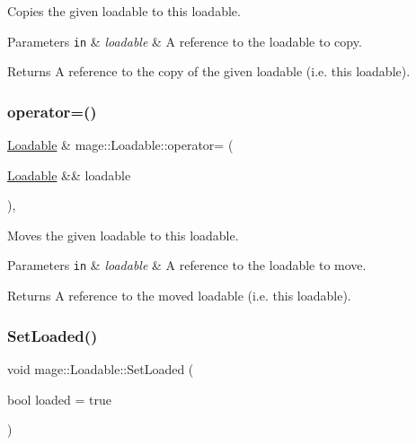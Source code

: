 Copies the given loadable to this loadable.


\begin{DoxyParams}[1]{Parameters}
\mbox{\tt in}  & {\em loadable} & A reference to the loadable to copy. \\
\hline
\end{DoxyParams}
\begin{DoxyReturn}{Returns}
A reference to the copy of the given loadable (i.\+e. this loadable). 
\end{DoxyReturn}
\hypertarget{classmage_1_1_loadable_a3853fa7d95ef2b5c8d27ff9884b73633}{}\label{classmage_1_1_loadable_a3853fa7d95ef2b5c8d27ff9884b73633} 
\subsubsection{\texorpdfstring{operator=()}{operator=()}\hspace{0.1cm}{\footnotesize\ttfamily [2/2]}}
{\footnotesize\ttfamily \hyperlink{classmage_1_1_loadable}{Loadable} \& mage\+::\+Loadable\+::operator= (\begin{DoxyParamCaption}\item[{\hyperlink{classmage_1_1_loadable}{Loadable} \&\&}]{loadable }\end{DoxyParamCaption})\hspace{0.3cm}{\ttfamily [protected]}, {\ttfamily [default]}}

Moves the given loadable to this loadable.


\begin{DoxyParams}[1]{Parameters}
\mbox{\tt in}  & {\em loadable} & A reference to the loadable to move. \\
\hline
\end{DoxyParams}
\begin{DoxyReturn}{Returns}
A reference to the moved loadable (i.\+e. this loadable). 
\end{DoxyReturn}
\hypertarget{classmage_1_1_loadable_a932ff8b287c8e68e30a13804cba08ff2}{}\label{classmage_1_1_loadable_a932ff8b287c8e68e30a13804cba08ff2} 
\subsubsection{\texorpdfstring{Set\+Loaded()}{SetLoaded()}}
{\footnotesize\ttfamily void mage\+::\+Loadable\+::\+Set\+Loaded (\begin{DoxyParamCaption}\item[{bool}]{loaded = {\ttfamily true} }\end{DoxyParamCaption})\hspace{0.3cm}{\ttfamily [protected]}}

